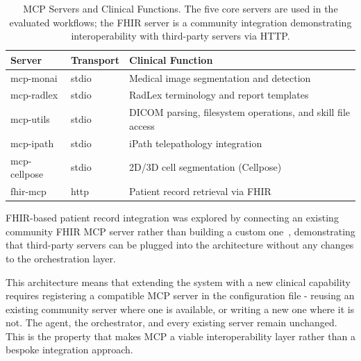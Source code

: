 \documentclass[conference]{IEEEtran}
\begin{document}
\begin{table}[t]
  \caption{MCP Servers and Clinical Functions. The five core servers are used in the evaluated workflows; the FHIR server is a community integration demonstrating interoperability with third-party servers via HTTP.}
  \label{tab:mcp-servers}
  \centering
  \begin{tabular}{lll}
    \toprule
    Server & Transport & Clinical Function \\
    \midrule
    mcp-monai    & stdio & Medical image segmentation and detection \\
    mcp-radlex   & stdio & RadLex terminology and report templates \\
    mcp-utils    & stdio & DICOM parsing, filesystem operations, and skill file access \\
    mcp-ipath    & stdio & iPath telepathology integration \\
    mcp-cellpose & stdio & 2D/3D cell segmentation (Cellpose) \\
    fhir-mcp     & http  & Patient record retrieval via FHIR \\
    \bottomrule
  \end{tabular}
\end{table}
FHIR-based patient record integration was explored by connecting an existing community FHIR MCP server rather than building a custom one~\cite{ehtesham2025mcpfhir}, demonstrating that third-party servers can be plugged into the architecture without any changes to the orchestration layer.

This architecture means that extending the system with a new clinical
capability requires registering a compatible MCP server in the configuration file - reusing an existing community server where one is available, or writing a new one where it is not. The agent, the orchestrator,
and every existing server remain unchanged.
This is the property that makes MCP a viable interoperability layer rather than a bespoke integration approach.


\end{document}
